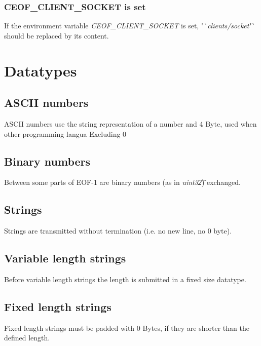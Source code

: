 \documentclass[12pt,a4paper]{article}
\begin{document}
\subsubsection{CEOF\_CLIENT_SOCKET is set}
If the environment variable \textit{CEOF\_CLIENT\_SOCKET} is set,
"`\textit{clients/socket}"` should be replaced by its content.
\section{Datatypes}
\subsection{ASCII numbers}
ASCII numbers use the string representation of a number and
4 Byte, used when other programming langua
Excluding 0
\subsection{Binary numbers}
Between some parts of EOF-1 are binary numbers (as in \textit{uint32\t})
exchanged.
\subsection{Strings}
Strings are transmitted without termination (i.e. no new line, no 0 byte).
\subsection{Variable length strings}
Before variable length strings the length is submitted in a fixed size
datatype.
\subsection{Fixed length strings}
Fixed length strings must be padded with 0 Bytes, if they are shorter
than the defined length.
\end{document}
